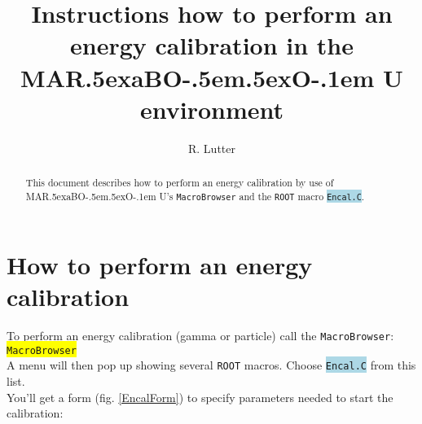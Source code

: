 \documentclass[10pt]{article}
\def\MARaBOU{MAR\lower.5ex\hbox{a}BO\kern-.5em\lower.5ex\hbox{O}\kern-.1em U}%
\newcommand{\blue}[1]{\colorbox{lightblue}{\texttt{#1}}}
\newcommand{\yellow}[1]{\colorbox{yellow}{\texttt{#1}}}
\begin{document}
\begin{titlepage}
\title{Instructions how to perform an energy calibration in the \MARaBOU{} environment}
\author{R. Lutter}
\maketitle
\vfill
\begin{abstract}
\setlength{\parindent}{0pt}
\begin{center}
This document describes how to perform an energy calibration by use of \MARaBOU{}'s \texttt{MacroBrowser} and the \texttt{ROOT} macro \blue{Encal.C}.
\end{center}
\end{abstract}
\vfill
\end{titlepage}
\newpage
\section{How to perform an energy calibration}\vspace{3mm}

To perform an energy calibration (gamma or particle) call the \texttt{MacroBrowser}:\\

\hspace*{.2\linewidth}\yellow{MacroBrowser}\\

A menu will then pop up showing several \texttt{ROOT} macros. Choose \blue{Encal.C} from this list.\\

You'll get a form (fig. \ref{EncalForm}) to specify parameters needed to start the calibration:\\
\end{document}
